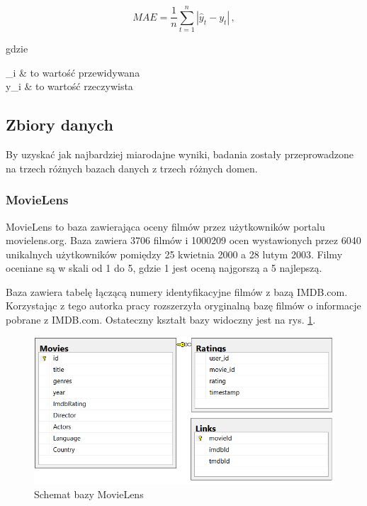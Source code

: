 \documentclass[twoside]{iisthesis}
\begin{document}
		\begin{equation}
		\label{eq:mae}
		MAE = \frac{1}{n} \sum_{t=1}^{n} |\hat{y}_t - y_t|
		\,,
		\end{equation}
		
		gdzie
		
		\begin{conditions*}
			_i & to wartość przewidywana \\
			y_i  &  to wartość rzeczywista
		\end{conditions*} 
	
	
		\subsection{Zbiory danych}
		
		By uzyskać jak najbardziej miarodajne wyniki, badania zostały przeprowadzone na trzech różnych bazach danych z trzech różnych domen. 
		
		\subsubsection{MovieLens}
		MovieLens \cite{harper2016movielens} to baza zawierająca oceny filmów przez użytkowników portalu movielens.org. Baza zawiera 3706 filmów i 1000209 ocen wystawionych przez 6040 unikalnych użytkowników pomiędzy 25 kwietnia 2000 a 28 lutym 2003. Filmy oceniane są w skali od 1 do 5, gdzie 1 jest oceną najgorszą a 5 najlepszą. 
		
		Baza zawiera tabelę łączącą numery identyfikacyjne filmów z bazą IMDB.com. Korzystając z tego autorka pracy rozszerzyła oryginalną bazę filmów o informacje pobrane z IMDB.com. Ostateczny kształt bazy widoczny jest na rys. \ref{fig:movielens_schema}.
		
			\begin{figure}[!ht] 
				\centering
				\includegraphics[width=1\textwidth]{movielens}
				\caption{Schemat bazy MovieLens}
				\label{fig:movielens_schema}
			\end{figure}
		
\end{document}
